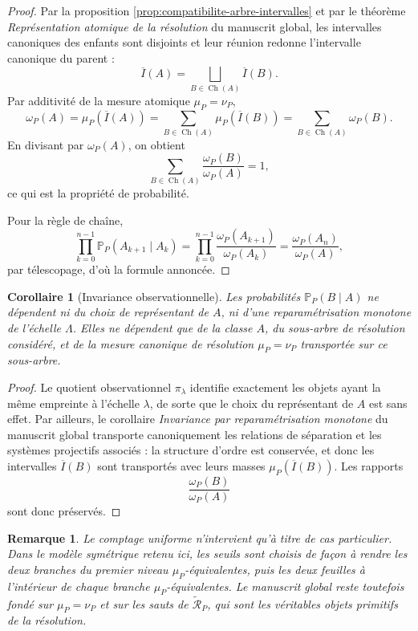 \documentclass[11pt,a4paper]{article}
\newtheorem{corollary}{Corollaire}
\newtheorem{remark}{Remarque}
\begin{document}
\begin{appendices}
\begin{proof}
Par la proposition \ref{prop:compatibilite-arbre-intervalles} et par le théorème \emph{Représentation atomique de la résolution} du manuscrit global, les intervalles canoniques des enfants sont disjoints et leur réunion redonne l'intervalle canonique du parent :
\[
\overline I(A)=\bigsqcup_{B\in\operatorname{Ch}(A)}\overline I(B).
\]
Par additivité de la mesure atomique \(\mu_P=\nu_P\),
\[
\omega_P(A)=\mu_P(\overline I(A))
=\sum_{B\in\operatorname{Ch}(A)}\mu_P(\overline I(B))
=\sum_{B\in\operatorname{Ch}(A)}\omega_P(B).
\]
En divisant par \(\omega_P(A)\), on obtient
\[
\sum_{B\in\operatorname{Ch}(A)}\frac{\omega_P(B)}{\omega_P(A)}=1,
\]
ce qui est la propriété de probabilité.

Pour la règle de chaîne,
\[
\prod_{k=0}^{n-1}\mathbb P_P(A_{k+1}\mid A_k)
=
\prod_{k=0}^{n-1}\frac{\omega_P(A_{k+1})}{\omega_P(A_k)}
=
\frac{\omega_P(A_n)}{\omega_P(A)},
\]
par télescopage, d'où la formule annoncée.
\end{proof}

\begin{corollary}[Invariance observationnelle]
Les probabilités \(\mathbb P_P(B\mid A)\) ne dépendent ni du choix de représentant de \(A\), ni d'une reparamétrisation monotone de l'échelle \(\Lambda\). Elles ne dépendent que de la classe \(A\), du sous-arbre de résolution considéré, et de la mesure canonique de résolution \(\mu_P=\nu_P\) transportée sur ce sous-arbre.
\end{corollary}

\begin{proof}
Le quotient observationnel \(\pi_\lambda\) identifie exactement les objets ayant la même empreinte à l'échelle \(\lambda\), de sorte que le choix du représentant de \(A\) est sans effet. Par ailleurs, le corollaire \emph{Invariance par reparamétrisation monotone} du manuscrit global transporte canoniquement les relations de séparation et les systèmes projectifs associés : la structure d'ordre est conservée, et donc les intervalles \(\overline I(B)\) sont transportés avec leurs masses \(\mu_P(\overline I(B))\). Les rapports
\[
\frac{\omega_P(B)}{\omega_P(A)}
\]
sont donc préservés.
\end{proof}

\begin{remark}
Le comptage uniforme n'intervient qu'à titre de cas particulier. Dans le modèle symétrique retenu ici, les seuils sont choisis de façon à rendre les deux branches du premier niveau \(\mu_P\)-équivalentes, puis les deux feuilles à l'intérieur de chaque branche \(\mu_P\)-équivalentes. Le manuscrit global reste toutefois fondé sur \(\mu_P=\nu_P\) et sur les sauts de \(\widetilde{\mathcal R}_P\), qui sont les véritables objets primitifs de la résolution.
\end{remark}


\end{appendices}
\end{document}
